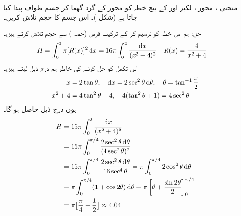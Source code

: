 منحنی ، محور ، لکیر  اور  کے بیچ خطہ کو محور  کے گرد گھما کر جسم طواف پیدا کیا جاتا ہے (شکل )۔ اس جسم کا حجم تلاش کریں۔

حل:\quad
ہم اس خطہ کو ترسیم کر کے ترکیب قرص (حصہ ) سے حجم تلاش کرتے ہیں۔
\begin{align*}
H&=\int_0^2\pi[R(x)]^2\dif x=16\pi\int_0^2\frac{\dif x}{(x^2+4)^2}&&R(x)=\frac{4}{x^2+4}
\end{align*}
اس تکمل کو حل کرنے کی خاطر ہم درج ذیل لیتے ہیں۔
\begin{align*}
x&=2\tan\theta,\quad \dif x=2\sec^2\theta\dif\theta,\quad \theta=\tan^{-1}\frac{x}{2}\\
x^2+4&=4\tan^2\theta+4,\quad 4(\tan^2\theta+1)=4\sec^2\theta 
\end{align*}
یوں درج ذیل حاصل ہو گا۔
\begin{align*}
H&=16\pi\int_0^2\frac{\dif x}{(x^2+4)^2}\\
&=16\pi\int_0^{\pi/4}\frac{2\sec^2\theta\dif\theta}{(4\sec^2\theta)^2}\\
&=16\pi\int_0^{\pi/4}\frac{2\sec^2\theta\dif\theta}{16\sec^4\theta}=\pi\int_0^{\pi/4}2\cos^2\theta\dif\theta\\
&=\pi\int_0^{\pi/4}(1+\cos 2\theta)\dif \theta=\pi\left[\theta+\frac{\sin2\theta}{2}\right]_0^{\pi/4}\\
&=\pi\big[\frac{\pi}{4}+\frac{1}{2}\big]\approx 4.04
\end{align*}
